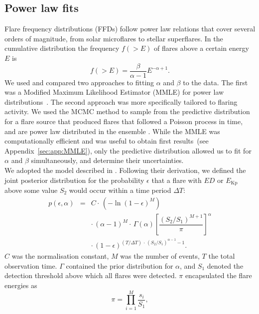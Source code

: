 \documentclass{aa}
\begin{document}
\subsection{Power law fits}
\label{powerlawfits}
Flare frequency distributions (FFDs) follow power law relations that cover several orders of magnitude, from solar microflares to stellar superflares. In the cumulative distribution the frequency $f(>E)$ of flares above a certain energy $E$ is
\begin{equation}
f(>E) = \dfrac{\beta}{\alpha - 1}E^{-\alpha + 1}.
\label{eqn:cumdist}
\end{equation}
We used and compared two approaches to fitting $\alpha$ and $\beta$ to the data. The first was a Modified Maximum Likelihood Estimator (MMLE) for power law distributions~\citep{maschberger_powerlaw_2009}. The second approach was more specifically tailored to flaring activity. We used the MCMC method to sample from the predictive distribution for a flare source that produced flares that followed a Poisson process in time, and are power law distributed in the ensemble \citep{wheatland_flaresbayes_2004}. While the MMLE was computationally efficient and was useful to obtain first results~(see Appendix~\ref{sec:app:MMLE}), only the predictive distribution allowed us to fit for $\alpha$ and $\beta$ simultaneously, and determine their uncertainties.
\\
We adopted the model described in \citet{wheatland_flaresbayes_2004}. Following their derivation, we defined the joint posterior distribution for the probability $\epsilon$ that a flare with $ED$ or $E_\mathrm{Kp}$ above some value $S_2$ would occur within a time period $\Delta T$:
\begin{eqnarray}
\label{joint_posterior}
p(\epsilon, \alpha) &=& C \cdot\, (-\ln(1 - \epsilon)^{M})\nonumber\\
                    && \cdot\, (\alpha-1)^M \cdot\, \Gamma(\alpha) \left[\dfrac{(S_2 / S_1)^{M+1}}{\pi} \right]^{\alpha}\nonumber\\
                    && \cdot\, (1-\epsilon)^{(T / \Delta T) \,\cdot\, (S_2 /S_1)^{\alpha-1} -1 }.
\end{eqnarray}
$C$ was the normalisation constant, $M$ was the number of events, $T$ the total observation time. $\Gamma$ contained the prior distribution for $\alpha$, and $S_1$ denoted the detection threshold above which all flares were detected. $\pi$ encapsulated the flare energies as
\begin{equation}
    \pi = \displaystyle \prod_{i=1}^M \dfrac{s_i}{S_1},
\end{equation}
\end{document}
